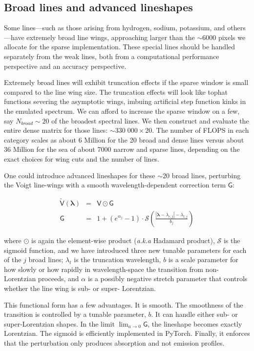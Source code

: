 \documentclass[twocolumn]{aastex631}
\begin{document}
\subsection{Broad lines and advanced lineshapes}

Some lines---such as those arising from hydrogen, sodium, potassium, and others---have extremely broad line wings, approaching larger than the $\sim6000$ pixels we allocate for the sparse implementation. These special lines should be handled separately from the weak lines, both from a computational performance perspective and an accuracy perspective.

Extremely broad lines will exhibit truncation effects if the sparse window is small compared to the line wing size. The truncation effects will look like tophat functions severing the asymptotic wings, imbuing artificial step function kinks in the emulated spectrum. We can afford to increase the sparse window on a few, say $N_{broad}\sim20$ of the broadest spectral lines. We then construct and evaluate the entire dense matrix for those lines: $\sim 330\;000 \times 20$. The number of FLOPS in each category scales as about 6 Million for the 20 broad and dense lines versus about 36 Million for the sea of about 7000 narrow and sparse lines, depending on the exact choices for wing cuts and the number of lines.

One could introduce advanced lineshapes for these $\sim20$ broad lines, perturbing the Voigt line-wings with a smooth wavelength-dependent correction term $\mathsf{G}$:

\begin{eqnarray}
    \mathsf{\tilde{V}(\bm{\lambda})} &=& \mathsf{V} \odot \mathsf{G}\\
    \mathsf{G} &=& 1 + (e^{\alpha_j} - 1) \cdot \mathcal{S}\left(\frac{|\bm{\lambda}-\lambda_{c,j}| - \lambda_{t, j}}{b_j}\right)
\end{eqnarray}

\noindent where $\odot$ is again the element-wise product (\emph{a.k.a} Hadamard product), $\mathcal{S}$ is the sigmoid function, and we have introduced three new tunable parameters for each of the $j$ broad lines; $\lambda_t$ is the truncation wavelength, $b$ is a scale parameter for how slowly or how rapidly in wavelength-space the transition from non-Lorentzian proceeds, and $\alpha$ is a possibly negative stretch parameter that controls whether the line wing is sub- or super- Lorentzian.

This functional form has a few advantages. It is smooth. The smoothness of the transition is controlled by a tunable parameter, $b$. It can handle either sub- or super-Lorentzian shapes. In the limit $\lim_{a\to0} \mathsf{G}$, the lineshape becomes exactly Lorentzian. The sigmoid is efficiently implemented in PyTorch.
Finally, it enforces that the perturbation only produces absorption and not emission profiles.
\end{document}
